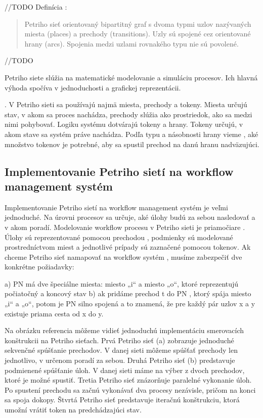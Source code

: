 //TODO
Definícia \cite{workflow_systemy} :
\begin{quote}
	Petriho sieť orientovaný bipartitný graf s dvoma typmi uzlov nazývaných miesta (places) a prechody (transitions). Uzly sú spojené cez orientované hrany (arcs). Spojenia medzi uzlami rovnakého typu nie sú povolené.
\end{quote}
//TODO



Petriho siete slúžia na matematické modelovanie a simuláciu procesov. Ich hlavná výhoda spočíva v jednoduchosti a grafickej reprezentácii. 


.  V Petriho sieti sa používajú najmä miesta, prechody a tokeny. Miesta určujú stav, v akom sa proces nachádza, prechody slúžia ako prostriedok, ako sa medzi nimi pohybovať. Logiku systému dotvárajú tokeny a hrany. Tokeny určujú, v akom stave sa systém práve nachádza. Podľa typu a násobnosti hrany vieme ,  aké množstvo tokenov je potrebné, aby sa spustil prechod na danú hranu nadväzujúci.


\subsection{Implementovanie Petriho sietí na workflow management systém}

Implementovanie Petriho sietí na workflow management systém je veľmi jednoduché.
Na úrovni procesov sa určuje,  aké úlohy budú za sebou nasledovať a v akom poradí. Modelovanie workflow procesu v Petriho sieti je priamočiare . Úlohy sú reprezentované pomocou prechodou , podmienky sú modelované prostredníctvom  miest a jednotlivé prípady sú zaznačené pomocou tokenov.  Ak chceme Petriho sieť namapovať na workflow systém , musíme zabezpečiť dve konkrétne požiadavky:

a) PN má dve špeciálne miesta: miesto „i“ a miesto „o“, ktoré reprezentujú počiatočný a koncový stav
b) ak pridáme prechod t do PN , ktorý spája miesto „i“ a „o“, potom je PN silno spojená a to znamená, že pre každý pár uzlov x a y  existuje priama cesta od x do y. 

Na obrázku referencia môžeme vidieť jednoduchú implementáciu smerovacích konštrukcii na Petriho sieťach.
Prvá Petriho sieť (a) zobrazuje jednoduché sekvenčné spúšťanie prechodov. V danej sieti  môžeme spúšťať prechody len jednotlivo, v určenom poradí za sebou.
Druhá Petriho sieť (b) predstavuje podmienené spúšťanie úloh. V danej sieti máme na výber z dvoch prechodov, ktoré je možné spustiť.
Tretia Petriho sieť znázorňuje paralelné vykonanie úloh. Po spustení prechodu sa začnú vykonávať dva procesy nezávisle, pričom na konci sa spoja dokopy.
Štvrtá Petriho sieť predstavuje iteračnú konštrukciu, ktorá umožní vrátiť token na predchádzajúci stav.


	


